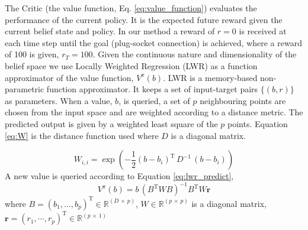 \documentclass[final,3p,times,twocolumn]{elsarticle}
\newcommand{\B}{b}
\newcommand{\U}{\dot{x}}
\newcommand{\invSigK}{\boldsymbol{\Sigma}^{[k]^{-1}}}
\newcommand{\SigK}{\boldsymbol{\Sigma}^{[k]}}
\newcommand{\Sig}[1]{\boldsymbol{\Sigma}^{[#1]}}
\newcommand{\Mu}[1]{\boldsymbol{\mu}^{[#1]}}
\newcommand{\MuK}{\boldsymbol{\mu}^{[k]}}
\newcommand{\piK}{w^{[k]}}
\newcommand{\Param}{\boldsymbol{\theta}}
\begin{document}


% 
%


The Critic (the value function, Eq. \ref{eq:value_function}) evaluates 
the performance of the current policy. It is the expected future reward given the current 
belief state and policy.
In our method a reward of $r=0$ is received at each time step
until the goal (plug-socket connection) is achieved, where a reward of 100 is given, $r_{T}=100$.
Given the continuous nature and dimensionality of the belief space we use Locally Weighted Regression \cite{Atkeson97locallyweighted}
(LWR) as a function approximator of the value function, $V^{\pi}(b)$. LWR is a memory-based non-parametric function 
approximator. It keeps a set of input-target pairs $\{(\B,r)\}$ as parameters. When a value, $\B$, is 
queried, a set of $p$ neighbouring points are chosen from the input space and are 
weighted according to a distance metric. The predicted output is given by a weighted 
least square of the $p$ points. Equation \ref{eq:W} is the distance function used where 
$D$ is a diagonal matrix.

\begin{equation}\label{eq:W}
 W_{i,i}  = \exp\left(-\frac{1}{2}(\B - \B_i)^{\mathrm{T}}\, D^{-1} \, (\B - \B_i) \right)
\end{equation}
A new value is queried according to Equation \ref{eq:lwr_predict},
\begin{equation}\label{eq:lwr_predict}
  V^{\pi}(b) = \B \,(B^{\mathrm{T}} W B)^{-1} B^{\mathrm{T}} W \mathbf{r}
\end{equation}
where $B = (\B_1,\dots,\B_p)^{\mathrm{T}} \in \mathbb{R}^{(D\, \times\, p)}$, $W \in \mathbb{R}^{(p\, \times\, p)}$ is
a diagonal matrix, $\mathbf{r} = (r_1,\cdots,r_p)^{\mathrm{T}} \in \mathbb{R}^{(p\, \times\, 1)}$
\end{document}
